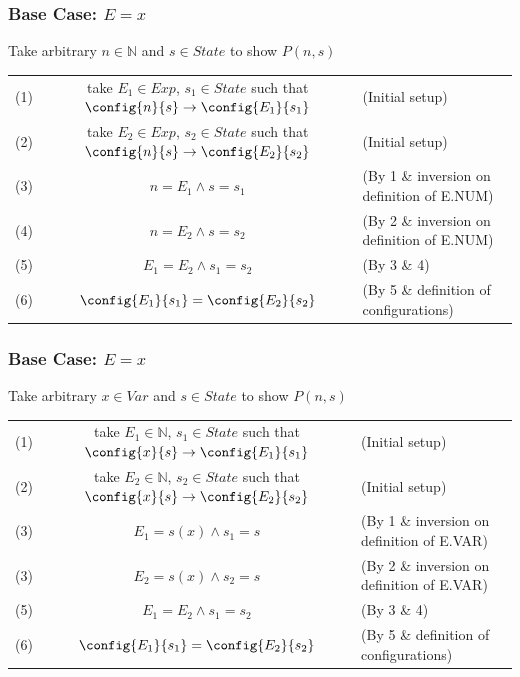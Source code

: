 \subsubsection*{Base Case: $E = x$}
Take arbitrary $n \in \mathbb{N}$ and $s \in State$ to show $P(n,s)$
\begin{center}
	\begin{tabular}{r c l}
		(1) & take $E_1 \in Exp$, $s_1 \in State$ such that $\config{n}{s} \to \config{E_1}{s_1}$ & (Initial setup)                            \\
		(2) & take $E_2 \in Exp$, $s_2 \in State$ such that $\config{n}{s} \to \config{E_2}{s_2}$ & (Initial setup)                            \\
		(3) & $n = E_1 \land s = s_1$                                                             & (By 1 \& inversion on definition of E.NUM) \\
		(4) & $n = E_2 \land s = s_2$                                                             & (By 2 \& inversion on definition of E.NUM) \\
		(5) & $E_1 = E_2 \land s_1 = s_2$                                                         & (By 3 \& 4)                                \\
		(6) & $\config{E_1}{s_1} = \config{E_2}{s_2}$                                             & (By 5 \& definition of configurations)     \\
	\end{tabular}
\end{center}
\subsubsection*{Base Case: $E = x$}
Take arbitrary $x \in Var$ and $s \in State$ to show $P(n,s)$
\begin{center}
	\begin{tabular}{r c l}
		(1) & take $E_1 \in \mathbb{N}$, $s_1 \in State$ such that $\config{x}{s} \to \config{E_1}{s_1}$ & (Initial setup)                            \\
		(2) & take $E_2 \in \mathbb{N}$, $s_2 \in State$ such that $\config{x}{s} \to \config{E_2}{s_2}$ & (Initial setup)                            \\
		(3) & $E_1 = s(x) \land s_1 = s$                                                                 & (By 1 \& inversion on definition of E.VAR) \\
		(3) & $E_2 = s(x) \land s_2 = s$                                                                 & (By 2 \& inversion on definition of E.VAR) \\
		(5) & $E_1 = E_2 \land s_1 = s_2$                                                                & (By 3 \& 4)                                \\
		(6) & $\config{E_1}{s_1} = \config{E_2}{s_2}$                                                    & (By 5 \& definition of configurations)     \\
	\end{tabular}
\end{center}

